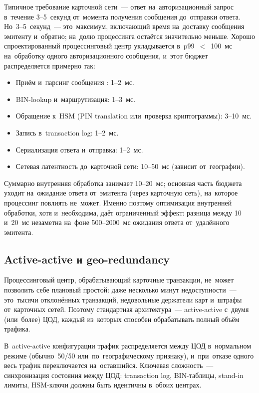 Типичное требование карточной сети~--- ответ на~авторизационный
запрос в~течение 3--5~секунд от~момента получения сообщения
до~отправки ответа. Но~3--5~секунд~--- это~максимум, включающий
время на~доставку сообщения эмитенту и~обратно; на~долю
процессинга остаётся значительно меньше. Хорошо спроектированный
процессинговый центр укладывается в~p99~$<$~100~мс
на~обработку одного авторизационного сообщения, и~этот бюджет
распределяется примерно так:

\begin{itemize}
  \item Приём и~парсинг сообщения : 1--2~мс.
  \item BIN-lookup и~маршрутизация: 1--3~мс.
  \item Обращение к~HSM (PIN translation или~проверка
        криптограммы): 3--10~мс.
  \item Запись в~transaction log: 1--2~мс.
  \item Сериализация ответа и~отправка: 1--2~мс.
  \item Сетевая латентность до~карточной сети: 10--50~мс
        (зависит от~географии).
\end{itemize}

Суммарно внутренняя обработка занимает 10--20~мс; основная
часть бюджета уходит на~ожидание ответа от~эмитента (через
карточную сеть), на~которое процессинг повлиять не~может.
Именно поэтому оптимизация внутренней обработки, хотя
и~необходима, даёт ограниченный эффект: разница между
10 и~20~мс незаметна на~фоне 500--2000~мс ожидания ответа
от~удалённого эмитента.

\subsection*{Active-active и geo-redundancy}

Процессинговый центр, обрабатывающий карточные транзакции,
не~может позволить себе плановый простой: даже несколько минут
недоступности~--- это~тысячи отклонённых транзакций, недовольные
держатели карт и~штрафы от~карточных сетей. Поэтому стандартная
архитектура~--- active-active с~двумя (или~более) ЦОД,
каждый из~которых способен обрабатывать полный объём трафика.

В~active-active конфигурации трафик распределяется между ЦОД
в~нормальном режиме (обычно~50/50 или~по~географическому
признаку), и~при~отказе одного весь трафик переключается
на~оставшийся. Ключевая сложность~--- синхронизация состояния
между ЦОД: transaction log, BIN-таблицы, stand-in лимиты,
HSM-ключи должны быть идентичны в~обоих центрах.

